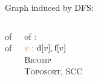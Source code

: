 
\begin{frame} 
  \centerline{\large Graph  induced by DFS:}

  \vspace{0.50cm}
  \begin{columns}
      \begin{center}
	 of  \\[15pt]

	 of 
      \end{center}
    \pause
      \begin{center}
	 of : \\[15pt]

	$\textcolor{brown}{v:} \text{ d}[v], \text{f}[v]$ \\[10pt]

	 \textsc{Bicomp} \\[10pt]

	 \textsc{Toposort}, \textsc{SCC}
      \end{center}
  \end{columns}
\end{frame}

